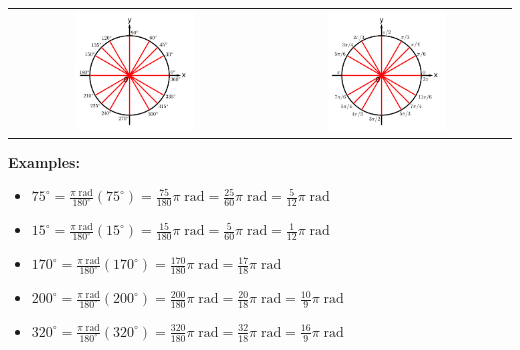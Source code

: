 \documentclass{article}
\begin{document}
\begin{tabular}{cc}
\parbox{0.5\textwidth}{
\includegraphics[width = 0.5\textwidth]{unit_circle_basic_degree_angles}
} & \parbox{0.5\textwidth}{
\includegraphics[width = 0.5\textwidth]{unit_circle_basic_radian_angles}
}
\end{tabular}

\textbf{Examples:}

\begin{itemize}
\item \(75^\circ = \frac{\pi\;\text{rad}}{180^\circ}(75^\circ) = \frac{75}{180}\pi\;\text{rad} = \frac{25}{60}\pi\;\text{rad} = \frac{5}{12}\pi\;\text{rad}\)
\item \(15^\circ = \frac{\pi\;\text{rad}}{180^\circ}(15^\circ) = \frac{15}{180}\pi\;\text{rad} = \frac{5}{60}\pi\;\text{rad} = \frac{1}{12}\pi\;\text{rad}\)
\item \(170^\circ = \frac{\pi\;\text{rad}}{180^\circ}(170^\circ) = \frac{170}{180}\pi\;\text{rad} = \frac{17}{18}\pi\;\text{rad}\)
\item \(200^\circ = \frac{\pi\;\text{rad}}{180^\circ}(200^\circ) = \frac{200}{180}\pi\;\text{rad} = \frac{20}{18}\pi\;\text{rad} = \frac{10}{9}\pi\;\text{rad}\)
\item \(320^\circ = \frac{\pi\;\text{rad}}{180^\circ}(320^\circ) = \frac{320}{180}\pi\;\text{rad} = \frac{32}{18}\pi\;\text{rad} = \frac{16}{9}\pi\;\text{rad}\)
\end{itemize} 
\end{document}
